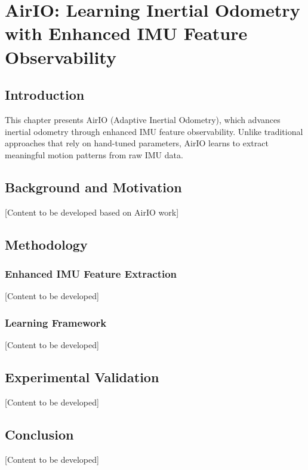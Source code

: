 \chapter{AirIO: Learning Inertial Odometry with Enhanced IMU Feature Observability} \label{chapter:airio}

\section{Introduction}

This chapter presents AirIO (Adaptive Inertial Odometry), which advances inertial odometry through enhanced IMU feature observability. Unlike traditional approaches that rely on hand-tuned parameters, AirIO learns to extract meaningful motion patterns from raw IMU data.

\section{Background and Motivation}

[Content to be developed based on AirIO work]

\section{Methodology}

\subsection{Enhanced IMU Feature Extraction}

[Content to be developed]

\subsection{Learning Framework}

[Content to be developed]

\section{Experimental Validation}

[Content to be developed]

\section{Conclusion}

[Content to be developed]